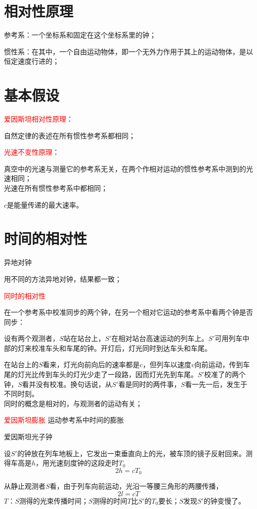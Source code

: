 \documentclass[12pt,a4paper]{article}
\begin{document}
\section{相对性原理}
参考系：一个坐标系和固定在这个坐标系里的钟；

惯性系：在其中，一个自由运动物体，即一个无外力作用于其上的运动物体，是以恒定速度行进的；

\section{基本假设}
\textcolor{red}{爱因斯坦相对性原理}：

自然定律的表述在所有惯性参考系都相同；

\textcolor{red}{光速不变性原理}：

真空中的光速与测量它的参考系无关，在两个作相对运动的惯性参考系中测到的光速相同；\\
光速在所有惯性参考系中都相同；

$c$是能量传递的最大速率。

\section{时间的相对性}
异地对钟

用不同的方法异地对钟，结果都一致；

\textcolor{red}{同时的相对性}

在一个参考系中校准同步的两个钟，在另一个相对它运动的参考系中看两个钟是否同步：

设有两个观测者，$S$站在站台上，$S'$在相对站台高速运动的列车上。$S'$可用列车中部的灯来校准车头和车尾的钟。开灯后，灯光同时到达车头和车尾。

在站台上的$S$看来，灯光向前向后的速率都是$c$，但列车以速度$v$向前运动，传到车尾的灯光比传到车头的灯光少走了一段路，因而灯光先到车尾。$S'$校准了的两个钟，$S$看并没有校准。换句话说，从$S'$看是同时的两件事，$S$看一先一后，发生于不同时刻。\\

同时的概念是相对的，与观测者的运动有关；

\textcolor{red}{爱因斯坦膨胀}
运动参考系中时间的膨胀

爱因斯坦光子钟

设$S'$的钟放在列车地板上，它发出一束垂直向上的光，被车顶的镜子反射回来。测得车高是$h$，用光速刻度钟的这段走时$T_0$
\begin{equation}
2h = cT_0
\end{equation}

从静止观测者$S$看，由于列车向前运动，光沿一等腰三角形的两腰传播，
\begin{equation}
2l = cT
\end{equation}
$T$：$S$测得的光束传播时间；$S$测得的时间$T$比$S'$的$T_0$要长；$S$发现$S'$的钟变慢了。
\end{document}
